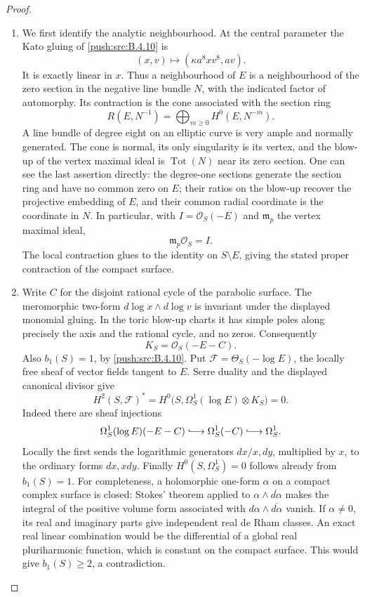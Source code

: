 \begin{proof}
\begin{enumerate}[label=\arabic*.,leftmargin=*]
\item We first identify the analytic neighbourhood.  At the central parameter the Kato gluing of \ref{push:src:B.4.10} is
\[
 (x,v)\longmapsto(\kappa a^8xv^8,av).
\]
It is exactly linear in $x$.  Thus a neighbourhood of $E$ is a
neighbourhood of the zero section in the negative line bundle
$N$, with the indicated factor of automorphy.
Its contraction is the cone associated with the section ring
\[
 R(E,N^{-1})=\bigoplus_{m\ge0}H^0(E,N^{-m}).
\]
A line bundle of degree eight on an elliptic curve is very ample
and normally generated.  The cone is normal, its only singularity
is its vertex, and the blow-up of the vertex maximal ideal is
$\operatorname{Tot}(N)$ near its zero section.
One can see the last assertion directly: the degree-one sections
generate the section ring and have no common zero on $E$;
their ratios on the blow-up recover the projective embedding of
$E$, and their common radial coordinate is the coordinate in $N$.
In particular, with $I=\mathcal O_S(-E)$ and $\mathfrak m_p$ the
vertex maximal ideal,
\[
 \mathfrak m_p\mathcal O_S=I.
\]
The local contraction glues to the identity on $S\setminus E$,
giving the stated proper contraction of the compact surface.

\item Write $C$ for the disjoint rational cycle of the parabolic surface.
The meromorphic two-form
$d\log x\wedge d\log v$ is invariant under the displayed
monomial gluing.  In the toric blow-up charts it has simple poles
along precisely the axis and the rational cycle, and no zeros.
Consequently
\[
 K_S=\mathcal O_S(-E-C).
\]
Also $b_1(S)=1$, by \ref{push:src:B.4.10}.
Put $\mathcal F=\Theta_S(-\log E)$, the locally free sheaf of
vector fields tangent to $E$.
Serre duality and the displayed canonical divisor give
\[
 H^2(S,\mathcal F)^*
 =H^0\bigl(S,\Omega^1_S(\log E)\otimes K_S\bigr)=0.
\]
Indeed there are sheaf injections
\[
 \Omega^1_S(\log E)(-E-C)
       \lhook\joinrel\longrightarrow\Omega^1_S(-C)
       \lhook\joinrel\longrightarrow\Omega^1_S.
\]
Locally the first sends the logarithmic generators
$dx/x,dy$, multiplied by $x$, to the ordinary forms $dx,xdy$.
Finally $H^0(S,\Omega^1_S)=0$ follows already from $b_1(S)=1$.
For completeness, a holomorphic one-form $\alpha$ on a compact
complex surface is closed: Stokes' theorem applied to
$\alpha\wedge\overline{d\alpha}$ makes the integral of the
positive volume form associated with
$d\alpha\wedge\overline{d\alpha}$ vanish.
If $\alpha\ne0$, its real and imaginary parts give independent
real de Rham classes.  An exact real linear combination would
be the differential of a global real pluriharmonic function,
which is constant on the compact surface.  This would give
$b_1(S)\ge2$, a contradiction.


\end{enumerate}
\end{proof}

